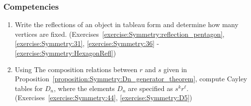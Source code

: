 \subsubsection*{Competencies}
\begin{enumerate}
\item
Write the reflections of an object in tableau form and determine how many vertices are fixed. (Exercises~\ref{exercise:Symmetry:reflection_pentagon}, \ref{exercise:Symmetry:31}, \ref{exercise:Symmetry:36} - \ref{exercise:Symmetry:HexagonRefl})
\item
Using  The composition relations between $r$ and $s$ given in  Proposition~\ref{proposition:Symmetry:Dn_generator_theorem}, compute Cayley tables for $D_n$, where the elements $D_n$ are specified as $s^k r^\ell$. (Exercises~\ref{exercise:Symmetry:44}, \ref{exercise:Symmetry:D5})
\end{enumerate}







